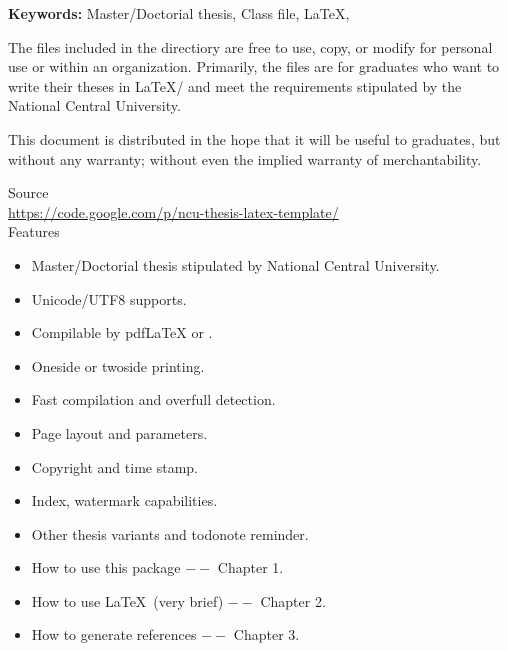 \begin{abstracten}

{\bf \sf Keywords:} Master/Doctorial thesis, Class file, \LaTeX, \XeLaTeX

\vspace{2em}

The files included in the directiory are free to use, copy, or modify for personal use or within an organization. Primarily, the files are for graduates who want to write their theses in \LaTeX/\XeLaTeX{} and meet the requirements stipulated by the National Central University.

This document is distributed in the hope that it will be useful to graduates, but without any warranty; without even the implied warranty of merchantability.
\begin{center}
Source\\
\url{https://code.google.com/p/ncu-thesis-latex-template/}\\
Features
\begin{itemize}
\item Master/Doctorial thesis stipulated by National Central University. 
\item Unicode/UTF8 supports.
\item Compilable by pdf\LaTeX{ } or \XeLaTeX. 
\item Oneside or twoside printing.
\item Fast compilation and overfull detection. 
\item Page layout and parameters.
\item Copyright and time stamp.
\item Index, watermark capabilities.
\item Other thesis variants and todonote reminder.
\item How to use this package $--$ Chapter 1.
\item How to use \LaTeX\ (very brief) $--$ Chapter 2.
\item How to generate references $--$ Chapter 3.
\end{itemize}
\end{center}
\end{abstracten} 

